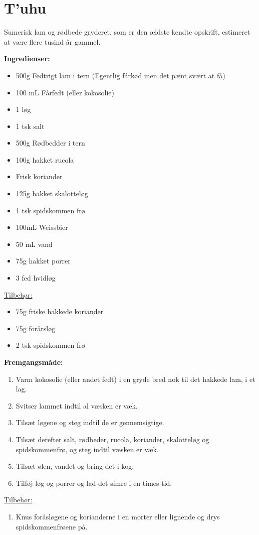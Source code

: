 \documentclass{book}
\begin{document}
\newpage \section{T'uhu}
Sumerisk lam og rødbede gryderet, som er den ældste kendte opskrift, estimeret at være flere tusind år gammel.

\begin{minipage}[t]{0.5\textwidth}
\textbf{Ingredienser:}
\begin{itemize}
    \item 500g Fedtrigt lam i tern (Egentlig fårkød men det pænt svært at få)
    \item 100 mL Fårfedt (eller kokosolie)
    \item 1 løg
    \item 1 tsk salt
    \item 500g Rødbedder i tern
    \item 100g hakket rucola
    \item Frisk koriander
    \item 125g hakket skalotteløg
    \item 1 tsk spidskommen frø
    \item 100mL Weissbier
    \item 50 mL vand
    \item 75g hakket porrer
    \item 3 fed hvidløg
\end{itemize}
\underline{Tilbehør:}
\begin{itemize}
    \item 75g friske hakkede koriander
    \item 75g forårsløg
    \item 2 tsk spidskommen frø
\end{itemize}
\end{minipage}%
\begin{minipage}[t]{0.5\textwidth}
\textbf{Fremgangsmåde:}
\begin{enumerate}
    \item Varm kokosolie (eller andet fedt) i en gryde bred nok til det hakkede lam, i et lag.
    \item Svitser lammet indtil al væsken er væk.
    \item Tilsæt løgene og steg indtil de er gennemsigtige.
    \item Tilsæt derefter salt, rødbeder, rucola, koriander, skalotteløg og spidskommenfrø, og steg indtil væsken er væk.
    \item Tilsæt ølen, vandet og bring det i kog.
    \item Tilføj løg og porrer og lad det simre i en times tid.
\end{enumerate}
\underline{Tilbehør:}
\begin{enumerate}
    \item Knus foråsløgene og korianderne i en morter eller lignende og drys spidskommenfrøene på.
\end{enumerate}
\end{minipage}
\end{document}
